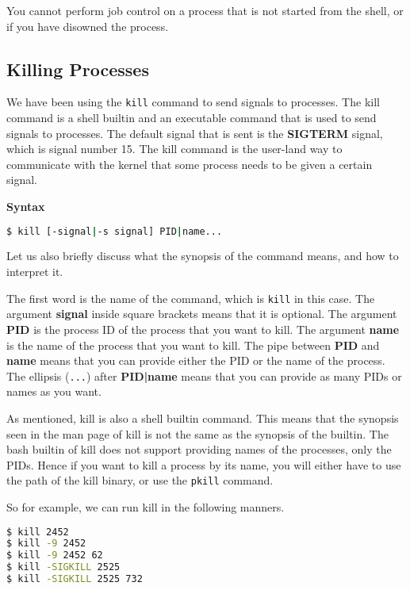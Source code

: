 You cannot perform job control on a process that is not started from the shell,
or if you have disowned the process.

\subsection{Killing Processes}

We have been using the \texttt{kill} command to send signals to processes.
The kill command is a shell builtin and an executable command that is used
to send signals to processes. The default signal that is sent is the
\textbf{SIGTERM} signal, which is signal number 15.
The kill command is the user-land way to communicate with the kernel that
some process needs to be given a certain signal.

\textbf{Syntax}

\begin{lstlisting}[language=bash]
$ kill [-signal|-s signal] PID|name...
\end{lstlisting}

Let us also briefly discuss what the synopsis of the command means, and
how to interpret it.

The first word is the name of the command, which is \texttt{kill} in this case.
The argument \textbf{signal} inside square brackets means that it is optional.
The argument \textbf{PID} is the process ID of the process that you want to kill.
The argument \textbf{name} is the name of the process that you want to kill.
The pipe between \textbf{PID} and \textbf{name} means that you can provide
either the PID or the name of the process.
The ellipsis (\texttt{...}) after \textbf{PID|name} means that you can provide
as many PIDs or names as you want.

\begin{remark}
  As mentioned, kill is also a shell builtin command. This means that
  the synopsis seen in the man page of kill is not the same as the
  synopsis of the builtin. The bash builtin of kill does not support
  providing names of the processes, only the PIDs. Hence if you want
  to kill a process by its name, you will either have to use the
  path of the kill binary, or use the \texttt{pkill} command.
\end{remark}

So for example, we can run kill in the following manners.

\begin{lstlisting}[language=bash]
$ kill 2452
$ kill -9 2452
$ kill -9 2452 62
$ kill -SIGKILL 2525
$ kill -SIGKILL 2525 732
\end{lstlisting}

